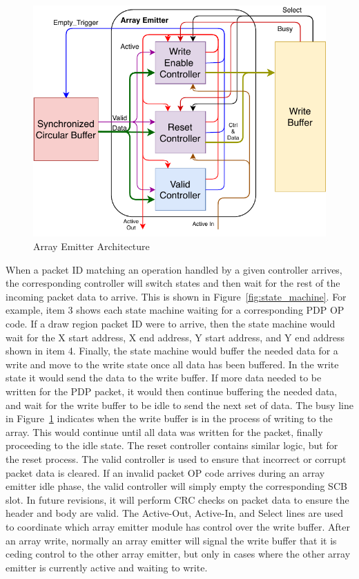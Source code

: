  \begin{figure}
    \centering
    \includegraphics[width=1.0\textwidth]{fig/pdp_ae_arch.pdf}
    \caption{Array Emitter Architecture}
    \label{fig:ae_arch}
\end{figure}

When a packet ID matching an operation handled by a given controller arrives, the corresponding controller will switch states and then wait for the rest of the incoming packet data to arrive. This is shown in Figure~\ref{fig:state_machine}. For example, item 3 shows each state machine waiting for a corresponding PDP OP code. If a draw region packet ID were to arrive, then the state machine would wait for the X start address, X end address, Y start address, and Y end address shown in item 4. Finally, the state machine would buffer the needed data for a write and move to the write state once all data has been buffered. In the write state it would send the data to the write buffer. If more data needed to be written for the PDP packet, it would then continue buffering the needed data, and wait for the write buffer to be idle to send the next set of data. The busy line in Figure~\ref{fig:ae_arch} indicates when the write buffer is in the process of writing to the array. This would continue until all data was written for the packet, finally proceeding to the idle state. The reset controller contains similar logic, but for the reset process. The valid controller is used to ensure that incorrect or corrupt packet data is cleared. If an invalid packet OP code arrives during an array emitter idle phase, the valid controller will simply empty the corresponding SCB slot. In future revisions, it will perform CRC checks on packet data to ensure the header and body are valid. The Active-Out, Active-In, and Select lines are used to coordinate which array emitter module has control over the write buffer. After an array write, normally an array emitter will signal the write buffer that it is ceding control to the other array emitter, but only in cases where the other array emitter is currently active and waiting to write.

